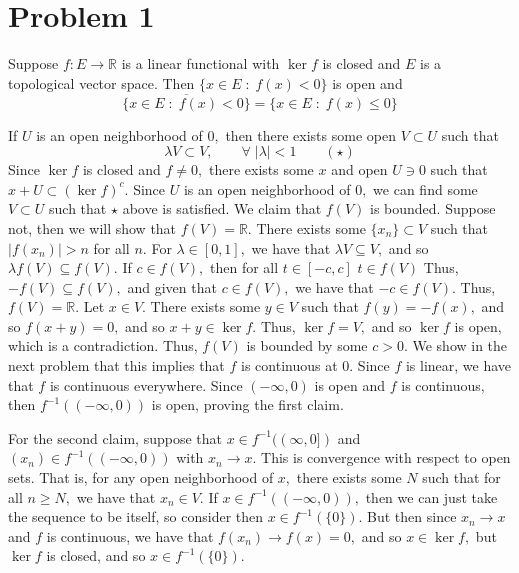 \documentclass[11pt]{article}
\newcommand{\bbR}{\mathbb{R}}
\begin{document}
	
	
	\psetheader

\section*{Problem 1}
\begin{problem}
    Suppose $f: E\to \bbR$ is a linear functional with $\ker f $ is closed and $E$ is a topological vector space. Then $\{x\in E \; : \; f(x) < 0\}$ is open and 
    \[\overline{\{x\in E \; : \; f(x) < 0\}} = \{x\in E \; : \; f(x) \leq 0\}\]
\end{problem}
\begin{solution}
If $U$ is an open neighborhood of $0,$ then there exists some open $V\subset U$ such that \[\lambda V \subset V,\qquad  \forall \; |\lambda| < 1\qquad (\star)\]  Since $\ker f$ is closed and $f\neq 0,$ there exists some $x$ and open $U\ni 0$ such that $x + U \subset (\ker f)^c.$ Since $U$ is an open neighborhood of $0,$ we can find some $V\subset U$ such that $\star$ above is satisfied. We claim that $f(V)$ is bounded. Suppose not, then we will show that $f(V) = \bbR.$ There exists some $\{x_n\}\subset V$ such that $|f(x_n)| > n$ for all $n.$ For $\lambda \in [0,1],$ we have that $\lambda V\subseteq V,$ and so $\lambda f(V)\subseteq f(V).$ If $c\in f(V),$ then for all $t \in [-c,c]$ $t\in f(V)$ Thus, $-f(V)\subseteq f(V),$ and given that $c\in f(V),$ we have that $-c \in f(V).$ Thus, $f(V) = \bbR$. Let $x\in V.$ There exists some $y\in V$ such that $f(y) = -f(x),$ and so $f(x +y) = 0,$ and so $x + y \in \ker f.$ Thus, $\ker f = V,$ and so $\ker f$ is open, which is a contradiction. Thus, $f(V)$ is bounded by some $c >0$. We show in the next problem that this implies that $f$ is continuous at $0.$ Since $f$ is linear, we have that $f$ is continuous everywhere. Since $(-\infty, 0)$ is open and $f$ is continuous, then $f^{-1}((-\infty, 0))$ is open, proving the first claim. 

For the second claim, suppose that $x \in f^{-1}((\infty, 0])$ and $(x_n)\in f^{-1}((-\infty, 0))$ with $x_n \to x.$ This is convergence with respect to open sets. That is, for any open neighborhood of $x,$ there exists some $N$ such that for all $n\geq N,$ we have that $x_n \in V.$ If $x \in f^{-1}((-\infty, 0)),$ then we can just take the sequence to be itself, so consider then $x \in f^{-1}(\{0\}).$ But then since $x_n \to x$ and $f$ is continuous, we have that $f(x_n) \to f(x)  = 0,$ and so $x\in \ker f,$ but $\ker f$ is closed, and so $x\in f^{-1}(\{0\}).$

\end{solution}
\end{document}
